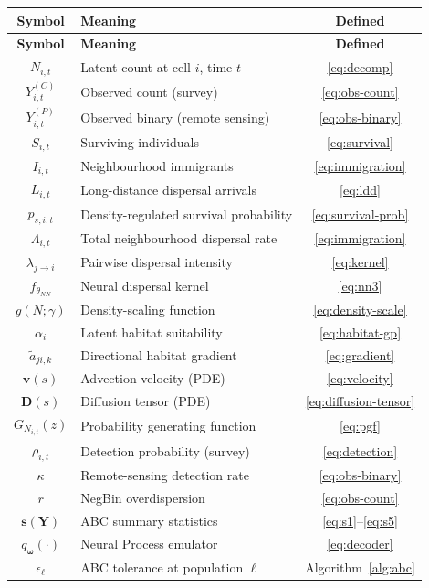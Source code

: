 \documentclass[12pt,a4paper]{article}
\theoremstyle{definition}
\newcommand{\bs}{\bm{s}}
\newcommand{\bomega}{\bm{\omega}}
\newcommand{\nn}{f_{\theta_{NN}}}
\begin{document}
\begin{longtable}{clc}
\toprule
\textbf{Symbol} & \textbf{Meaning} & \textbf{Defined} \\
\midrule
\endfirsthead
\toprule
\textbf{Symbol} & \textbf{Meaning} & \textbf{Defined} \\
\midrule
\endhead
\bottomrule
\endlastfoot
$N_{i,t}$ & Latent count at cell $i$, time $t$ & \eqref{eq:decomp} \\
$Y_{i,t}^{(C)}$ & Observed count (survey) & \eqref{eq:obs-count} \\
$Y_{i,t}^{(P)}$ & Observed binary (remote sensing) & \eqref{eq:obs-binary} \\
$S_{i,t}$ & Surviving individuals & \eqref{eq:survival} \\
$I_{i,t}$ & Neighbourhood immigrants & \eqref{eq:immigration} \\
$L_{i,t}$ & Long-distance dispersal arrivals & \eqref{eq:ldd} \\
$p_{s,i,t}$ & Density-regulated survival probability & \eqref{eq:survival-prob} \\
$\Lambda_{i,t}$ & Total neighbourhood dispersal rate & \eqref{eq:immigration} \\
$\lambda_{j\to i}$ & Pairwise dispersal intensity & \eqref{eq:kernel} \\
$\nn$ & Neural dispersal kernel & \eqref{eq:nn3} \\
$g(N;\gamma)$ & Density-scaling function & \eqref{eq:density-scale} \\
$\alpha_i$ & Latent habitat suitability & \eqref{eq:habitat-gp} \\
$\tilde{a}_{ji,k}$ & Directional habitat gradient & \eqref{eq:gradient} \\
$\mathbf{v}(s)$ & Advection velocity (PDE) & \eqref{eq:velocity} \\
$\mathbf{D}(s)$ & Diffusion tensor (PDE) & \eqref{eq:diffusion-tensor} \\
$G_{N_{i,t}}(z)$ & Probability generating function & \eqref{eq:pgf} \\
$\rho_{i,t}$ & Detection probability (survey) & \eqref{eq:detection} \\
$\kappa$ & Remote-sensing detection rate & \eqref{eq:obs-binary} \\
$r$ & NegBin overdispersion & \eqref{eq:obs-count} \\
$\bs(\mathbf{Y})$ & ABC summary statistics & \eqref{eq:s1}--\eqref{eq:s5} \\
$q_{\bomega}(\cdot)$ & Neural Process emulator & \eqref{eq:decoder} \\
$\epsilon_\ell$ & ABC tolerance at population $\ell$ & Algorithm~\ref{alg:abc} \\
\end{longtable}



\end{document}
